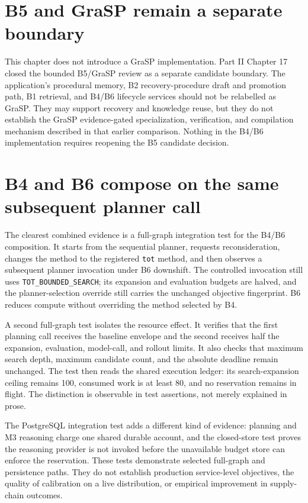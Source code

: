\section{B5 and GraSP remain a separate boundary}
\label{sec:ch23-b5-boundary}

This chapter does not introduce a GraSP implementation. Part II Chapter 17 closed the bounded B5/GraSP review as a separate candidate boundary. The application's procedural memory, B2 recovery-procedure draft and promotion path, B1 retrieval, and B4/B6 lifecycle services should not be relabelled as GraSP. They may support recovery and knowledge reuse, but they do not establish the GraSP evidence-gated specialization, verification, and compilation mechanism described in that earlier comparison. Nothing in the B4/B6 implementation requires reopening the B5 candidate decision.

\section{B4 and B6 compose on the same subsequent planner call}
\label{sec:ch23-combined-b4-b6}

The clearest combined evidence is a full-graph integration test for the B4/B6 composition. It starts from the sequential planner, requests reconsideration, changes the method to the registered \texttt{tot} method, and then observes a subsequent planner invocation under B6 downshift. The controlled invocation still uses \texttt{TOT\_BOUNDED\_SEARCH}; its expansion and evaluation budgets are halved, and the planner-selection override still carries the unchanged objective fingerprint. B6 reduces compute without overriding the method selected by B4.

A second full-graph test isolates the resource effect. It verifies that the first planning call receives the baseline envelope and the second receives half the expansion, evaluation, model-call, and rollout limits. It also checks that maximum search depth, maximum candidate count, and the absolute deadline remain unchanged. The test then reads the shared execution ledger: its search-expansion ceiling remains 100, consumed work is at least 80, and no reservation remains in flight. The distinction is observable in test assertions, not merely explained in prose.

The PostgreSQL integration test adds a different kind of evidence: planning and M3 reasoning charge one shared durable account, and the closed-store test proves the reasoning provider is not invoked before the unavailable budget store can enforce the reservation. These tests demonstrate selected full-graph and persistence paths. They do not establish production service-level objectives, the quality of calibration on a live distribution, or empirical improvement in supply-chain outcomes.

